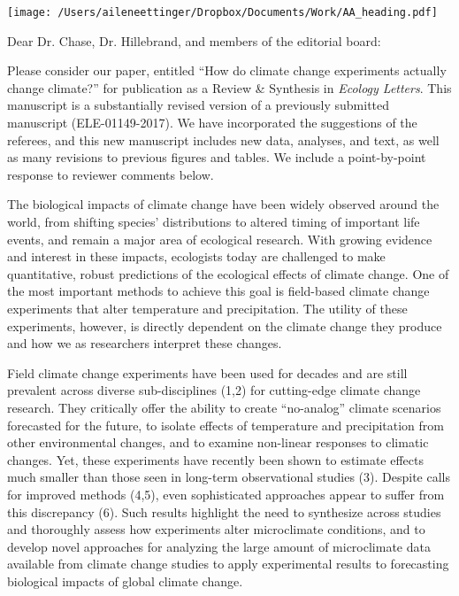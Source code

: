 \documentclass[11pt,a4paper]{letter}
\begin{document}


\begin{letter}{}
\texttt{[image: /Users/aileneettinger/Dropbox/Documents/Work/AA\_heading.pdf]}

\opening{Dear Dr. Chase, Dr. Hillebrand, and members of the editorial board:}
Please consider our paper, entitled ``How do climate change experiments actually change climate?'' for publication as a Review \& Synthesis in \emph{Ecology Letters}. This manuscript is a substantially revised version of a previously submitted manuscript  (ELE-01149-2017). We have incorporated the suggestions of the referees, and this new manuscript includes new data, analyses, and text, as well as many revisions to previous figures and tables. We include a point-by-point response to reviewer comments below.

The biological impacts of climate change have been widely observed around the world, from shifting species' distributions to altered timing of important life events, and remain a major area of ecological research. With growing evidence and interest in these impacts, ecologists today are challenged to make quantitative, robust predictions of the ecological effects of climate change. One of the most important methods to achieve this goal is field-based climate change experiments that alter temperature and precipitation. The utility of these experiments, however, is directly dependent on the climate change they produce and how we as researchers interpret these changes. 

Field climate change experiments have been used for decades and are still prevalent across diverse sub-disciplines  (1,2) %
for cutting-edge climate change research. They critically offer the ability to create ``no-analog'' climate scenarios forecasted for the future, to isolate effects of temperature and precipitation from other environmental changes, and to examine non-linear responses to climatic changes. Yet, these experiments have recently been shown to estimate effects much smaller than those seen in long-term observational studies (3). %
Despite calls for improved methods (4,5), %
even sophisticated approaches appear to suffer from this discrepancy (6). %
Such results highlight the need to synthesize across studies and thoroughly assess how experiments alter microclimate conditions, and to develop novel approaches for analyzing the large amount of microclimate data available from climate change studies to apply experimental results to forecasting biological impacts of global climate change. 


\end{letter}
\end{document}
